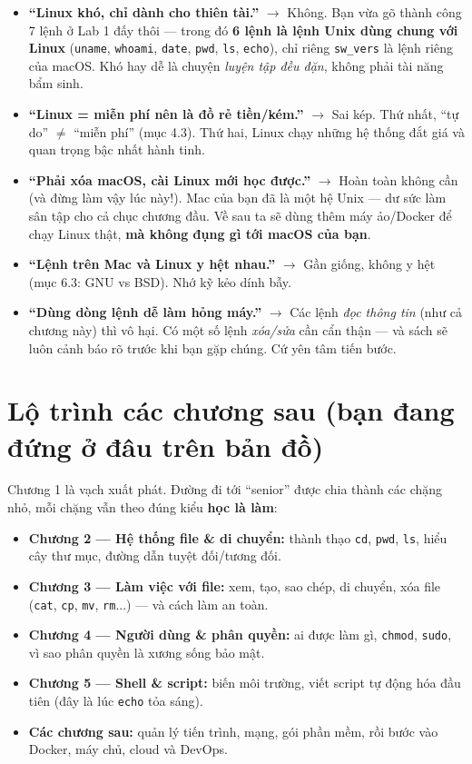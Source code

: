 \documentclass[12pt,a4paper]{article}
\begin{document}
\begin{itemize}[leftmargin=*]
  \item \textbf{``Linux khó, chỉ dành cho thiên tài.''} $\rightarrow$ Không. Bạn vừa gõ thành công 7 lệnh ở Lab 1 đấy thôi — trong đó \textbf{6 lệnh là lệnh Unix dùng chung với Linux} (\texttt{uname}, \texttt{whoami}, \texttt{date}, \texttt{pwd}, \texttt{ls}, \texttt{echo}), chỉ riêng \texttt{sw\_vers} là lệnh riêng của macOS. Khó hay dễ là chuyện \textit{luyện tập đều đặn}, không phải tài năng bẩm sinh.
  \item \textbf{``Linux = miễn phí nên là đồ rẻ tiền/kém.''} $\rightarrow$ Sai kép. Thứ nhất, ``tự do'' $\neq$ ``miễn phí'' (mục 4.3). Thứ hai, Linux chạy những hệ thống đắt giá và quan trọng bậc nhất hành tinh.
  \item \textbf{``Phải xóa macOS, cài Linux mới học được.''} $\rightarrow$ Hoàn toàn không cần (và đừng làm vậy lúc này!). Mac của bạn đã là một hệ Unix — dư sức làm sân tập cho cả chục chương đầu. Về sau ta sẽ dùng thêm máy ảo/Docker để chạy Linux thật, \textbf{mà không đụng gì tới macOS của bạn}.
  \item \textbf{``Lệnh trên Mac và Linux y hệt nhau.''} $\rightarrow$ Gần giống, không y hệt (mục 6.3: GNU vs BSD). Nhớ kỹ kẻo dính bẫy.
  \item \textbf{``Dùng dòng lệnh dễ làm hỏng máy.''} $\rightarrow$ Các lệnh \textit{đọc thông tin} (như cả chương này) thì vô hại. Có một số lệnh \textit{xóa/sửa} cần cẩn thận — và sách sẽ luôn cảnh báo rõ trước khi bạn gặp chúng. Cứ yên tâm tiến bước.
\end{itemize}

\section{Lộ trình các chương sau (bạn đang đứng ở đâu trên bản đồ)}

Chương 1 là vạch xuất phát. Đường đi tới ``senior'' được chia thành các chặng nhỏ, mỗi chặng vẫn theo đúng kiểu \textbf{học là làm}:

\begin{itemize}[leftmargin=*]
  \item \textbf{Chương 2 — Hệ thống file \& di chuyển:} thành thạo \texttt{cd}, \texttt{pwd}, \texttt{ls}, hiểu cây thư mục, đường dẫn tuyệt đối/tương đối.
  \item \textbf{Chương 3 — Làm việc với file:} xem, tạo, sao chép, di chuyển, xóa file (\texttt{cat}, \texttt{cp}, \texttt{mv}, \texttt{rm}...) — và cách làm an toàn.
  \item \textbf{Chương 4 — Người dùng \& phân quyền:} ai được làm gì, \texttt{chmod}, \texttt{sudo}, vì sao phân quyền là xương sống bảo mật.
  \item \textbf{Chương 5 — Shell \& script:} biến môi trường, viết script tự động hóa đầu tiên (đây là lúc \texttt{echo} tỏa sáng).
  \item \textbf{Các chương sau:} quản lý tiến trình, mạng, gói phần mềm, rồi bước vào Docker, máy chủ, cloud và DevOps.
\end{itemize}
\end{document}

